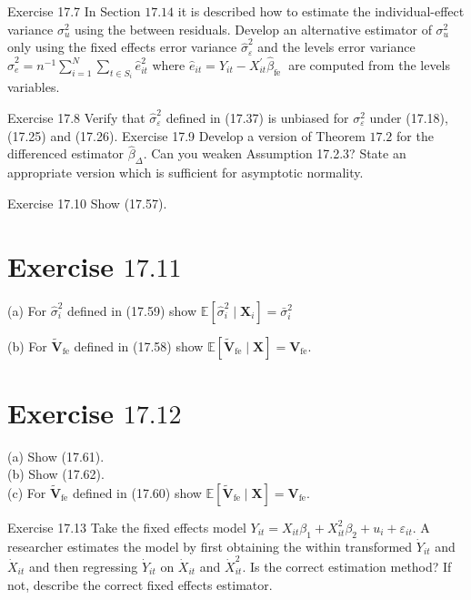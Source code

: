 \documentclass[10pt]{article}
\begin{document}
Exercise 17.7 In Section $17.14$ it is described how to estimate the individual-effect variance $\sigma_{u}^{2}$ using the between residuals. Develop an alternative estimator of $\sigma_{u}^{2}$ only using the fixed effects error variance $\widehat{\sigma}_{\varepsilon}^{2}$ and the levels error variance $\widehat{\sigma}_{e}^{2}=n^{-1} \sum_{i=1}^{N} \sum_{t \in S_{i}} \widehat{e}_{i t}^{2}$ where $\widehat{e}_{i t}=Y_{i t}-X_{i t}^{\prime} \widehat{\beta}_{\text {fe }}$ are computed from the levels variables.

Exercise 17.8 Verify that $\widehat{\sigma}_{\varepsilon}^{2}$ defined in (17.37) is unbiased for $\sigma_{\varepsilon}^{2}$ under (17.18), (17.25) and (17.26). Exercise 17.9 Develop a version of Theorem $17.2$ for the differenced estimator $\widehat{\beta}_{\Delta}$. Can you weaken Assumption 17.2.3? State an appropriate version which is sufficient for asymptotic normality.

Exercise 17.10 Show (17.57).

\section{Exercise $17.11$}
(a) For $\widehat{\sigma}_{i}^{2}$ defined in (17.59) show $\mathbb{E}\left[\widehat{\sigma}_{i}^{2} \mid \boldsymbol{X}_{i}\right]=\bar{\sigma}_{i}^{2}$

(b) For $\widetilde{\boldsymbol{V}}_{\mathrm{fe}}$ defined in (17.58) show $\mathbb{E}\left[\widetilde{\boldsymbol{V}}_{\mathrm{fe}} \mid \boldsymbol{X}\right]=\boldsymbol{V}_{\mathrm{fe}}$.

\section{Exercise $17.12$}
(a) Show (17.61).\\
(b) Show (17.62).\\
(c) For $\widetilde{\boldsymbol{V}}_{\mathrm{fe}}$ defined in (17.60) show $\mathbb{E}\left[\widetilde{\boldsymbol{V}}_{\mathrm{fe}} \mid \boldsymbol{X}\right]=\boldsymbol{V}_{\mathrm{fe}}$.

Exercise 17.13 Take the fixed effects model $Y_{i t}=X_{i t} \beta_{1}+X_{i t}^{2} \beta_{2}+u_{i}+\varepsilon_{i t}$. A researcher estimates the model by first obtaining the within transformed $\dot{Y}_{i t}$ and $\dot{X}_{i t}$ and then regressing $\dot{Y}_{i t}$ on $\dot{X}_{i t}$ and $\dot{X}_{i t}^{2}$. Is the correct estimation method? If not, describe the correct fixed effects estimator.
\end{document}
